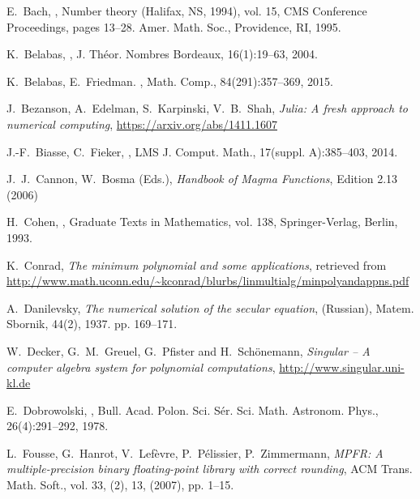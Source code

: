 \documentclass{sig-alternate-05-2015}
\begin{document}
{\footnotesize
\begin{thebibliographyy}{99}

E.~Bach,
,
\newblock Number theory ({H}alifax, {NS}, 1994), vol. 15, CMS
  Conference Proceedings, pages 13--28. Amer. Math. Soc., Providence, RI, 1995.

K.~Belabas,
,
\newblock J. Th\'eor. Nombres Bordeaux, 16(1):19--63, 2004.

K.~Belabas, E.~Friedman.
,
\newblock Math. Comp., 84(291):357--369, 2015.

J.~Bezanson, A.~Edelman, S.~Karpinski, V.~B.~Shah, {\em Julia: A fresh approach to numerical computing}, \url{https://arxiv.org/abs/1411.1607}

J.-F.~Biasse, C.~Fieker,
,
\newblock LMS J. Comput. Math., 17(suppl. A):385--403, 2014.

J.~J.~Cannon, W.~Bosma (Eds.), {\em Handbook of Magma Functions}, Edition 2.13 (2006)

H.~Cohen,
,
  Graduate Texts in Mathematics, vol. 138,
\newblock Springer-Verlag, Berlin, 1993.

K.~Conrad, {\em The minimum polynomial and some applications}, retrieved from
\url{http://www.math.uconn.edu/~kconrad/blurbs/linmultialg/minpolyandappns.pdf}

A.~Danilevsky, {\em The numerical solution of the secular equation}, (Russian),
Matem. Sbornik, 44(2), 1937. pp. 169--171.

W.~Decker, G.~M.~Greuel, G.~Pfister and H.~Sch\"onemann, {\em Singular -- A computer algebra system for polynomial computations}, \url{http://www.singular.uni-kl.de}

E.~Dobrowolski,
,
\newblock Bull. Acad. Polon. Sci. S\'er. Sci. Math. Astronom. Phys.,
  26(4):291--292, 1978.

L.~Fousse, G.~Hanrot, V.~Lef\`{e}vre, P.~P\'{e}lissier, P.~Zimmermann, {\em MPFR: A multiple-precision
binary floating-point library with correct rounding}, ACM Trans. Math. Soft., vol. 33, (2), 13, (2007), pp. 1--15.


\end{thebibliographyy}}
\end{document}
